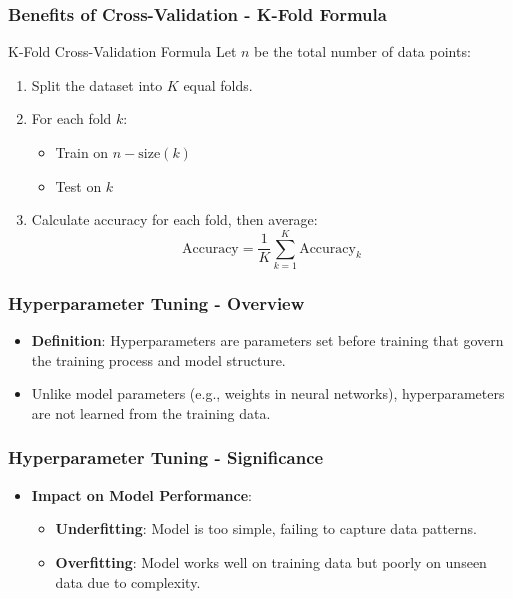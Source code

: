 \documentclass[aspectratio=169]{beamer}
\begin{document}
\begin{frame}[fragile]
    \frametitle{Benefits of Cross-Validation - K-Fold Formula}
    \begin{block}{K-Fold Cross-Validation Formula}
        Let \( n \) be the total number of data points:
        \begin{enumerate}
            \item Split the dataset into \( K \) equal folds.
            \item For each fold \( k \):
                \begin{itemize}
                    \item Train on \( n - \text{size}(k) \)
                    \item Test on \( k \)
                \end{itemize}
            \item Calculate accuracy for each fold, then average:
            \begin{equation}
                \text{Accuracy} = \frac{1}{K} \sum_{k=1}^{K} \text{Accuracy}_k
            \end{equation}
        \end{enumerate}
    \end{block}
\end{frame}

\begin{frame}[fragile]
    \frametitle{Hyperparameter Tuning - Overview}
    \begin{itemize}
        \item \textbf{Definition}: Hyperparameters are parameters set before training that govern the training process and model structure.
        \item Unlike model parameters (e.g., weights in neural networks), hyperparameters are not learned from the training data.
    \end{itemize}
\end{frame}

\begin{frame}[fragile]
    \frametitle{Hyperparameter Tuning - Significance}
    \begin{itemize}
        \item \textbf{Impact on Model Performance}:
        \begin{itemize}
            \item \textbf{Underfitting}: Model is too simple, failing to capture data patterns.
            \item \textbf{Overfitting}: Model works well on training data but poorly on unseen data due to complexity.
        \end{itemize}
    \end{itemize}
\end{frame}
\end{document}

